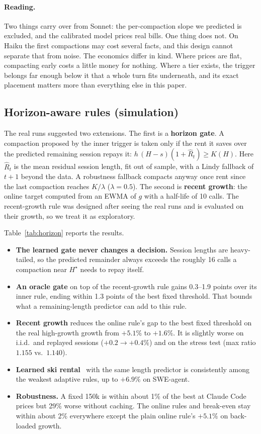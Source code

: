 \documentclass[11pt]{article}
\begin{document}
\paragraph{Reading.} Two things carry over from Sonnet: the per-compaction slope we predicted is excluded, and the calibrated model prices real bills. One thing does not. On Haiku the first compactions may cost several facts, and this design cannot separate that from noise. The economics differ in kind. Where prices are flat, compacting early costs a little money for nothing. Where a tier exists, the trigger belongs far enough below it that a whole turn fits underneath, and its exact placement matters more than everything else in this paper.

\subsection{Horizon-aware rules (simulation)}\label{sec:horizon}
The real runs suggested two extensions. The first is a \textbf{horizon gate}. A compaction proposed by the inner trigger is taken only if the rent it saves over the predicted remaining session repays it: $h\,(H-s)(1+\hat R_t)\ge K(H)$. Here $\hat R_t$ is the mean residual session length, fit out of sample, with a Lindy fallback of $t+1$ beyond the data. A robustness fallback compacts anyway once rent since the last compaction reaches $K/\lambda$ ($\lambda=0.5$). The second is \textbf{recent growth}: the online target computed from an EWMA of $g$ with a half-life of 10 calls. The recent-growth rule was designed after seeing the real runs and is evaluated on their growth, so we treat it as exploratory.

Table~\ref{tab:horizon} reports the results.
\begin{itemize}
\item \textbf{The learned gate never changes a decision.} Session lengths are heavy-tailed, so the predicted remainder always exceeds the roughly 16 calls a compaction near $H^\star$ needs to repay itself.
\item \textbf{An oracle gate} on top of the recent-growth rule gains 0.3--1.9 points over its inner rule, ending within 1.3 points of the best fixed threshold. That bounds what a remaining-length predictor can add to this rule.
\item \textbf{Recent growth} reduces the online rule's gap to the best fixed threshold on the real high-growth growth from $+5.1\%$ to $+1.6\%$. It is slightly worse on i.i.d.\ and replayed sessions ($+0.2\to+0.4\%$) and on the stress test (max ratio $1.155$ vs.\ $1.140$).
\item \textbf{Learned ski rental}~\cite{purohit18} with the same length predictor is consistently among the weakest adaptive rules, up to $+6.9\%$ on SWE-agent.
\item \textbf{Robustness.} A fixed 150k is within about 1\% of the best at Claude Code prices but 29\% worse without caching. The online rules and break-even stay within about 2\% everywhere except the plain online rule's $+5.1\%$ on back-loaded growth.
\end{itemize}
\end{document}
